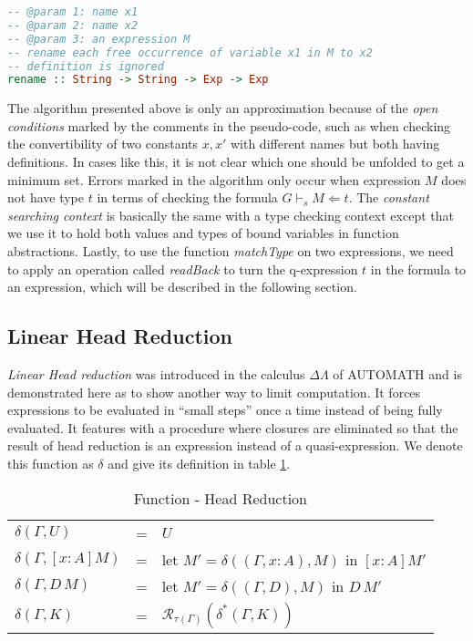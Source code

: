 \begin{lstlisting}[language=Haskell, caption={Approximation Algorithm For Minimum Set of Constants}, label={theory:alg:minimum}]
-- @param 1: name x1
-- @param 2: name x2
-- @param 3: an expression M
-- rename each free occurrence of variable x1 in M to x2
-- definition is ignored
rename :: String -> String -> Exp -> Exp
\end{lstlisting}

The algorithm presented above is only an approximation because of the \emph{open conditions} marked by the comments in the pseudo-code, such as when checking the convertibility of two constants $x,x'$ with different names but both having definitions. In cases like this, it is not clear which one should be unfolded to get a minimum set. Errors marked in the algorithm only occur when expression $M$ does not have type $t$ in terms of checking the formula $G \vdash_s M \Leftarrow t$. The \emph{constant searching context} is basically the same with a type checking context except that we use it to hold both values and types of bound variables in function abstractions. Lastly, to use the function \emph{matchType} on two expressions, we need to apply an operation called \emph{readBack} to turn the q-expression $t$ in the formula to an expression, which will be described in the following section.

\subsection{Linear Head Reduction}\label{theory:head-red}
\emph{Linear Head reduction} was introduced in the calculus $\Delta\Lambda$ of AUTOMATH\cite{de1994generalizing} and is demonstrated here as to show another way to limit computation. It forces expressions to be evaluated in ``small steps'' once a time instead of being fully evaluated. It features with a procedure where closures are eliminated so that the result of head reduction is an expression instead of a quasi-expression. We denote this function as $\delta$ and give its definition in table \ref{theory:tab:head-red}.
\begin{table}[h]
  \centering
  \begin{tabular}{l l p{8cm}}
    $\delta(\Gamma, U)$ & = & $U$ \\
    $\delta(\Gamma, [x : A]M)$ & = & let $M' = \delta((\Gamma, x:A), M)$ in $[x : A]M'$\\
    $\delta(\Gamma, D\,M)$ & = & let $M' = \delta((\Gamma, D), M)$ in $D\,M'$\\
    $\delta(\Gamma, K)$ & = & $\mathcal{R}_{\tau(\Gamma)}(\delta^*(\Gamma, K))$
  \end{tabular}
  \caption{Function - Head Reduction}
  \label{theory:tab:head-red}
\end{table}


